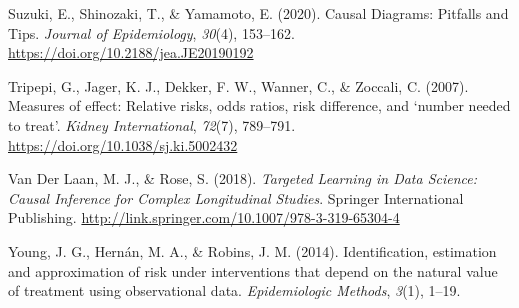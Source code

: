 \documentclass[
  single column]{article}
\newlength{\cslhangindent}
\newenvironment{CSLReferences}[2] %
 {\begin{list}{}{%
  \setlength{\itemindent}{0pt}
  \setlength{\leftmargin}{0pt}
  \setlength{\parsep}{0pt}
  \ifodd #1
   \setlength{\leftmargin}{\cslhangindent}
   \setlength{\itemindent}{-1\cslhangindent}
  \fi
  \setlength{\itemsep}{#2\baselineskip}}}
 {\end{list}}
\begin{document}
\begin{CSLReferences}{1}{0}
Suzuki, E., Shinozaki, T., \& Yamamoto, E. (2020). Causal Diagrams:
Pitfalls and Tips. \emph{Journal of Epidemiology}, \emph{30}(4),
153--162. \url{https://doi.org/10.2188/jea.JE20190192}

Tripepi, G., Jager, K. J., Dekker, F. W., Wanner, C., \& Zoccali, C.
(2007). Measures of effect: Relative risks, odds ratios, risk
difference, and {`}number needed to treat{'}. \emph{Kidney
International}, \emph{72}(7), 789--791.
\url{https://doi.org/10.1038/sj.ki.5002432}

Van Der Laan, M. J., \& Rose, S. (2018). \emph{Targeted Learning in Data
Science: Causal Inference for Complex Longitudinal Studies}. Springer
International Publishing.
\url{http://link.springer.com/10.1007/978-3-319-65304-4}

Young, J. G., Hernán, M. A., \& Robins, J. M. (2014). Identification,
estimation and approximation of risk under interventions that depend on
the natural value of treatment using observational data.
\emph{Epidemiologic Methods}, \emph{3}(1), 1--19.

\end{CSLReferences}
\end{document}
